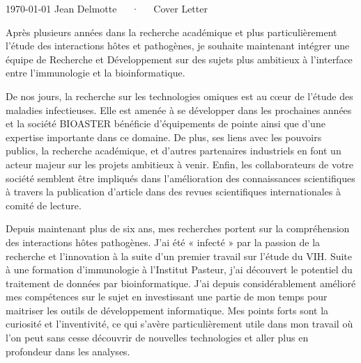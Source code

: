 \documentclass[11pt, a4paper]{awesome-cv}
\begin{document}
\makecvheader[R]

\makecvfooter
  {\today}
  {Jean Delmotte~~~·~~~Cover Letter}
  {\thepage}
\makelettertitle

\begin{cvletter}

Après plusieurs années dans la recherche académique et plus particulièrement l’étude des interactions hôtes et pathogènes, je souhaite maintenant intégrer une équipe de Recherche et Développement sur des sujets plus ambitieux à l’interface entre l’immunologie et la bioinformatique.

De nos jours, la recherche sur les technologies omiques est au cœur de l’étude des maladies infectieuses. Elle est amenée à se développer dans les prochaines années et la société BIOASTER bénéficie d’équipements de pointe ainsi que d’une expertise importante dans ce domaine. De plus, ses liens avec les pouvoirs publics, la recherche académique, et d’autres partenaires industriels en font un acteur majeur sur les projets ambitieux à venir. Enfin, les collaborateurs de votre société semblent être impliqués dans l’amélioration des connaissances scientifiques à travers la publication d’article dans des revues scientifiques internationales à comité de lecture.

Depuis maintenant plus de six ans, mes recherches portent sur la compréhension des interactions hôtes pathogènes. J'ai été « infecté » par la passion de la recherche et l’innovation à la suite d’un premier travail sur l'étude du VIH. Suite à une formation d'immunologie à l’Institut Pasteur, j’ai découvert le potentiel du traitement de données par bioinformatique. J’ai depuis considérablement amélioré mes compétences sur le sujet en investissant une partie de mon temps pour maitriser les outils de développement informatique. Mes points forts sont la curiosité et l'inventivité, ce qui s'avère particulièrement utile dans mon travail où l'on peut sans cesse découvrir de nouvelles technologies et aller plus en profondeur dans les analyses.


\end{cvletter}
\end{document}
